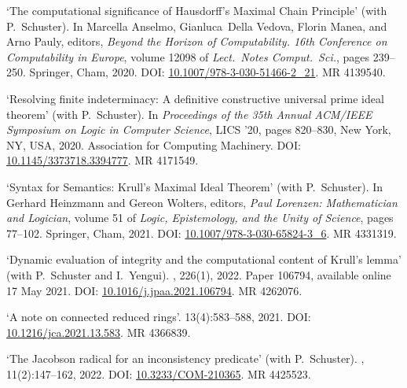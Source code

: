 \documentclass[a4paper]{article}
\begin{document}
\begin{flushleft}
\begin{thebibliography}{10}
\newblock `The computational significance of {H}ausdorff's {M}aximal {C}hain {P}rinciple' (with P.~Schuster).
\newblock In Marcella Anselmo, Gianluca~Della Vedova, Florin Manea, and Arno
  Pauly, editors, {\em Beyond the Horizon of Computability. 16th Conference on
  Computability in Europe}, volume 12098 of {\em Lect.~Notes Comput.~Sci.},
  pages 239--250. Springer, Cham, 2020.
\newblock DOI: \href{https://doi.org/10.1007/978-3-030-51466-2_21}{10.1007/978-3-030-51466-2\_21}.
\newblock MR 4139540.

\newblock `Resolving finite indeterminacy: A definitive constructive universal prime ideal theorem' (with P.~Schuster).
\newblock In {\em Proceedings of the 35th Annual ACM/IEEE Symposium on Logic in
  Computer Science}, LICS '20, pages 820--830, New York, NY, USA, 2020.
  Association for Computing Machinery.
\newblock DOI: \href{https://doi.org/10.1145/3373718.3394777}{10.1145/3373718.3394777}.
\newblock MR 4171549.

\newblock `Syntax for {S}emantics: {K}rull's {M}aximal {I}deal {T}heorem' (with P.~Schuster).
\newblock In Gerhard Heinzmann and Gereon Wolters, editors, {\em Paul Lorenzen:
  Mathematician and Logician}, volume 51 of {\em Logic, Epistemology, and the Unity of Science},
  pages 77--102. Springer, Cham, 2021.
\newblock DOI: \href{https://doi.org/10.1007/978-3-030-65824-3_6}{10.1007/978-3-030-65824-3\_6}.
\newblock MR 4331319.

\newblock `Dynamic evaluation of integrity and the computational content of {K}rull's lemma' (with P.~Schuster and I.~Yengui).
, 226(1), 2022.
\newblock Paper 106794, available online 17 May 2021.
\newblock DOI: \href{https://doi.org/10.1016/j.jpaa.2021.106794}{10.1016/j.jpaa.2021.106794}.
\newblock MR 4262076.

\newblock `A note on connected reduced rings'.
 13(4):583--588, 2021.
\newblock DOI: \href{https://doi.org/10.1216/jca.2021.13.583}{10.1216/jca.2021.13.583}.
\newblock MR 4366839.

\newblock `The Jacobson radical for an inconsistency predicate' (with P.~Schuster).
, 11(2):147--162, 2022.
\newblock DOI: \href{https://doi.org/10.3233/COM-210365}{10.3233/COM-210365}.
\newblock MR 4425523.


\end{thebibliography}
\end{flushleft}
\end{document}
